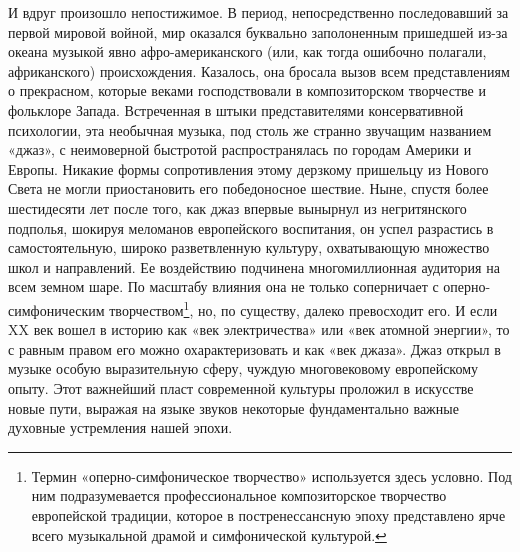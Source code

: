 И   вдруг   произошло    непостижимое.   В   период,   непосредственно
последовавший  за  первой  мировой   войной,  мир  оказался  буквально
заполоненным  пришедшей из-за  океана музыкой  явно афро-американского
(или,  как  тогда   ошибочно  полагали,  африканского)  происхождения.
Казалось,  она   бросала  вызов  всем  представлениям   о  прекрасном,
которые   веками   господствовали   в  композиторском   творчестве   и
фольклоре Запада.  Встреченная в штыки  представителями консервативной
психологии,  эта  необычная  музыка,  под столь  же  странно  звучащим
названием   «джаз»,  с   неимоверной  быстротой   распространялась  по
городам   Америки  и   Европы.  Никакие   формы  сопротивления   этому
дерзкому  пришельцу  из  Нового   Света  не  могли  приостановить  его
победоносное  шествие.  Ныне,  спустя   более  шестидесяти  лет  после
того,   как  джаз   впервые   вынырнул   из  негритянского   подполья,
шокируя  меломанов  европейского  воспитания, он  успел  разрастись  в
самостоятельную, широко разветвленную культуру, охватывающую множество
школ   и  направлений.   Ее   воздействию  подчинена   многомиллионная
аудитория  на   всем  земном   шаре.  По   масштабу  влияния   она  не
только соперничает  с оперно-симфоническим творчеством\footnote{Термин
«оперно-симфоническое творчество» используется  здесь условно. Под ним
подразумевается профессиональное композиторское творчество европейской
традиции,  которое в  постренессансную эпоху  представлено ярче  всего
музыкальной  драмой  и  симфонической культурой.},  но,  по  существу,
далеко  превосходит его.  И  если  XX век  вошел  в  историю как  «век
электричества» или «век атомной энергии», то с равным правом его можно
охарактеризовать  и  как «век  джаза».  Джаз  открыл в  музыке  особую
выразительную  сферу, чуждую  многовековому  европейскому опыту.  Этот
важнейший пласт современной культуры  проложил в искусстве новые пути,
выражая  на  языке  звуков некоторые  фундаментально  важные  духовные
устремления нашей эпохи.

